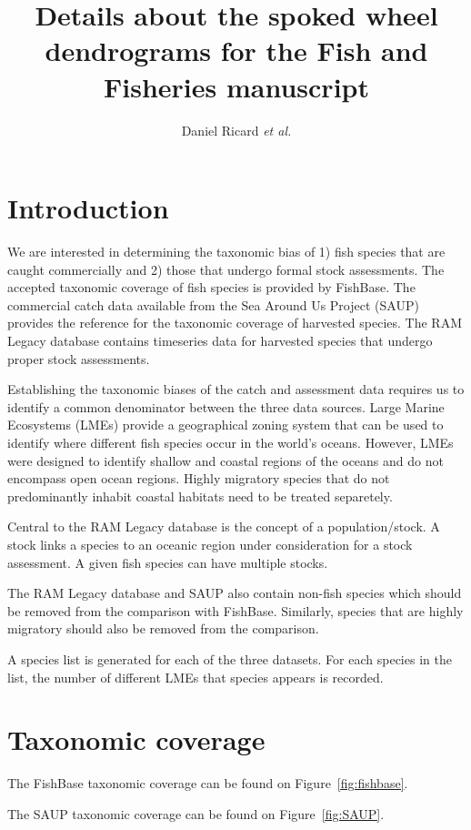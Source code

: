 \documentclass[letterpaper,12pt]{article}
\title{Details about the spoked wheel dendrograms for the Fish and Fisheries manuscript}
\author{Daniel Ricard \textit{et al.}}
\begin{document}
\maketitle
\section{Introduction}
We are interested in determining the taxonomic bias of 1) fish species
that are caught commercially and 2) those that undergo formal stock
assessments. The accepted taxonomic coverage of fish species is
provided by FishBase. The commercial catch data available from the Sea
Around Us Project (SAUP) provides the reference for the taxonomic
coverage of harvested species. The RAM Legacy database contains
timeseries data for harvested species that undergo proper stock
assessments.

Establishing the taxonomic biases of the catch and assessment data
requires us to identify a common denominator between the three data
sources. Large Marine Ecosystems (LMEs) provide a geographical zoning
system that can be used to identify where different fish species occur
in the world's oceans. However, LMEs were designed to identify shallow
and coastal regions of the oceans and do not encompass open ocean
regions.  Highly migratory species that do not predominantly inhabit
coastal habitats need to be treated separetely.

Central to the RAM Legacy database is the concept of a
population/stock. A stock links a species to an oceanic region under
consideration for a stock assessment. A given fish species can have multiple
stocks.

The RAM Legacy database and SAUP also contain non-fish species which
should be removed from the comparison with FishBase. Similarly,
species that are highly migratory should also be removed from the comparison. 

A species list is generated for each of the three datasets. For each
species in the list, the number of different LMEs that species
appears is recorded. 

\section{Taxonomic coverage}


The FishBase taxonomic coverage can be found on Figure~\ref{fig:fishbase}.


The SAUP taxonomic coverage can be found on Figure~\ref{fig:SAUP}.
\end{document}

